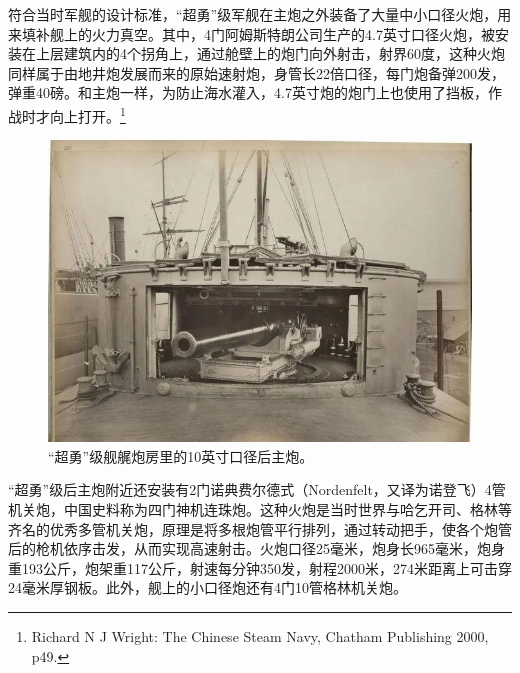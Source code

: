 \documentclass[12pt,UTF8]{ctexbook}
\begin{document}
符合当时军舰的设计标准，“超勇”级军舰在主炮之外装备了大量中小口径火炮，用来填补舰上的火力真空。其中，4门阿姆斯特朗公司生产的4.7英寸口径火炮，被安装在上层建筑内的4个拐角上，通过舱壁上的炮门向外射击，射界60度，这种火炮同样属于由地井炮发展而来的原始速射炮，身管长22倍口径，每门炮备弹200发，弹重40磅。和主炮一样，为防止海水灌入，4.7英寸炮的炮门上也使用了挡板，作战时才向上打开。\footnote{Richard N J Wright: The Chinese Steam Navy, Chatham Publishing 2000, p49.}

\begin{figure}[htbp]
	\centering
	\includegraphics[width=1\linewidth]{Images/27}
	\caption{“超勇”级舰艉炮房里的10英寸口径后主炮。}
	\label{fig:1}
\end{figure}

“超勇”级后主炮附近还安装有2门诺典费尔德式（Nordenfelt，又译为诺登飞）4管机关炮，中国史料称为四门神机连珠炮。这种火炮是当时世界与哈乞开司、格林等齐名的优秀多管机关炮，原理是将多根炮管平行排列，通过转动把手，使各个炮管后的枪机依序击发，从而实现高速射击。火炮口径25毫米，炮身长965毫米，炮身重193公斤，炮架重117公斤，射速每分钟350发，射程2000米，274米距离上可击穿24毫米厚钢板。此外，舰上的小口径炮还有4门10管格林机关炮。
\end{document}
